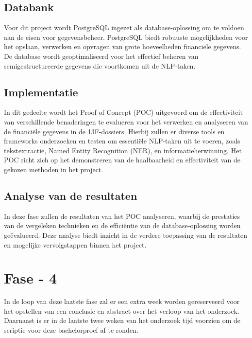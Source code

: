\subsection{Databank}
Voor dit project wordt PostgreSQL ingezet als database-oplossing om te voldoen aan de eisen voor gegevensbeheer. PostgreSQL biedt robuuste mogelijkheden voor het opslaan, verwerken en opvragen van grote hoeveelheden financiële gegevens. De database wordt geoptimaliseerd voor het effectief beheren van semigestructureerde gegevens die voortkomen uit de NLP-taken.

\subsection{Implementatie}
In dit gedeelte wordt het Proof of Concept (POC) uitgevoerd om de effectiviteit van verschillende benaderingen te evalueren voor het verwerken en analyseren van de financiële gegevens in de 13F-dossiers. Hierbij zullen er diverse tools en frameworks onderzoeken en testen om essentiële NLP-taken uit te voeren, zoals tekstextractie, Named Entity Recognition (NER), en informatieherwinning. Het POC richt zich op het demonstreren van de haalbaarheid en effectiviteit van de gekozen methoden in het project.

\subsection{Analyse van de resultaten}
In deze fase zullen de resultaten van het POC analyseren, waarbij de prestaties van de vergeleken technieken en de efficiëntie van de database-oplossing worden geëvalueerd. Deze analyse biedt inzicht in de verdere toepassing van de resultaten en mogelijke vervolgstappen binnen het project. %

\section{Fase - 4}
In de loop van deze laatste fase zal er een extra week worden gereserveerd voor het opstellen van een conclusie en abstract over het verloop van het onderzoek. Daarnaast is er in de laatste twee weken van het onderzoek tijd voorzien om de scriptie voor deze bachelorproef af te ronden.